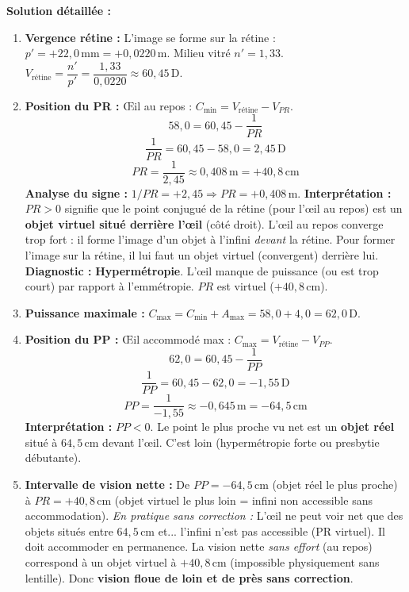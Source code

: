 \documentclass[11pt]{article}
\begin{document}
\begin{exoresolu}
\tcblower
\textbf{Solution détaillée :}
\begin{enumerate}
    \item \textbf{Vergence rétine :} L'image se forme sur la rétine : $p' = +22,0\,\text{mm} = +0,0220\,\text{m}$. Milieu vitré $n' = 1,33$.
    $V_{\text{rétine}} = \dfrac{n'}{p'} = \dfrac{1,33}{0,0220} \approx 60,45\,\text{D}$.
    \item \textbf{Position du PR :} Œil au repos : $C_{\text{min}} = V_{\text{rétine}} - V_{PR}$.
    \[
    58,0 = 60,45 - \frac{1}{PR}
    \]
    \[
    \frac{1}{PR} = 60,45 - 58,0 = 2,45\,\text{D}
    \]
    \[
    PR = \frac{1}{2,45} \approx 0,408\,\text{m} = +40,8\,\text{cm}
    \]
    \textbf{Analyse du signe :} $1/PR = +2,45 \Rightarrow PR = +0,408\,\text{m}$.
    \textbf{Interprétation :} $PR > 0$ signifie que le point conjugué de la rétine (pour l'œil au repos) est un \textbf{objet virtuel situé derrière l'œil} (côté droit). L'œil au repos converge trop fort : il forme l'image d'un objet à l'infini \emph{devant} la rétine. Pour former l'image sur la rétine, il lui faut un objet virtuel (convergent) derrière lui.
    \textbf{Diagnostic :} \textbf{Hypermétropie}. L'œil manque de puissance (ou est trop court) par rapport à l'emmétropie. $PR$ est virtuel ($+40,8\,\text{cm}$).
    \item \textbf{Puissance maximale :} $C_{\text{max}} = C_{\text{min}} + A_{\text{max}} = 58,0 + 4,0 = 62,0\,\text{D}$.
    \item \textbf{Position du PP :} Œil accommodé max : $C_{\text{max}} = V_{\text{rétine}} - V_{PP}$.
    \[
    62,0 = 60,45 - \frac{1}{PP}
    \]
    \[
    \frac{1}{PP} = 60,45 - 62,0 = -1,55\,\text{D}
    \]
    \[
    PP = \frac{1}{-1,55} \approx -0,645\,\text{m} = -64,5\,\text{cm}
    \]
    \textbf{Interprétation :} $PP < 0$. Le point le plus proche vu net est un \textbf{objet réel} situé à $64,5\,\text{cm}$ devant l'œil. C'est loin (hypermétropie forte ou presbytie débutante).
    \item \textbf{Intervalle de vision nette :} De $PP = -64,5\,\text{cm}$ (objet réel le plus proche) à $PR = +40,8\,\text{cm}$ (objet virtuel le plus loin = infini non accessible sans accommodation).
    \textit{En pratique sans correction :} L'œil ne peut voir net que des objets situés entre $64,5\,\text{cm}$ et... l'infini n'est pas accessible (PR virtuel). Il doit accommoder en permanence. La vision nette \emph{sans effort} (au repos) correspond à un objet virtuel à $+40,8\,\text{cm}$ (impossible physiquement sans lentille). Donc \textbf{vision floue de loin et de près sans correction}.
\end{enumerate}
\end{exoresolu}
\end{document}

